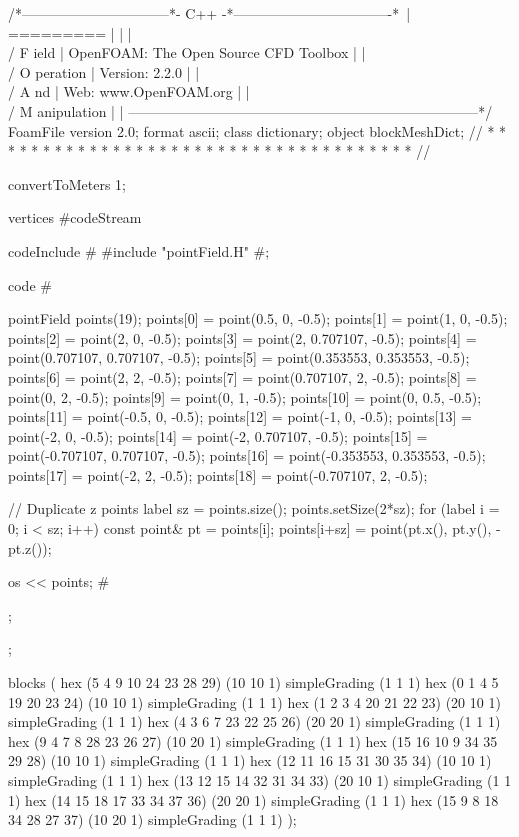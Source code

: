 \begin{OFverbatim}
/*--------------------------------*- C++ -*----------------------------------*\
| =========                 |                                                 |
| \\      /  F ield         | OpenFOAM: The Open Source CFD Toolbox           |
|  \\    /   O peration     | Version:  2.2.0                                 |
|   \\  /    A nd           | Web:      www.OpenFOAM.org                      |
|    \\/     M anipulation  |                                                 |
\*---------------------------------------------------------------------------*/
FoamFile
{
    version     2.0;
    format      ascii;
    class       dictionary;
    object      blockMeshDict;
}
// * * * * * * * * * * * * * * * * * * * * * * * * * * * * * * * * * * * * * //

convertToMeters 1;

vertices #codeStream
{
    codeInclude
    #{
        #include "pointField.H"
    #};

    code
    #{
        pointField points(19);
        points[0]  = point(0.5, 0, -0.5);
        points[1]  = point(1, 0, -0.5);
        points[2]  = point(2, 0, -0.5);
        points[3]  = point(2, 0.707107, -0.5);
        points[4]  = point(0.707107, 0.707107, -0.5);
        points[5]  = point(0.353553, 0.353553, -0.5);
        points[6]  = point(2, 2, -0.5);
        points[7]  = point(0.707107, 2, -0.5);
        points[8]  = point(0, 2, -0.5);
        points[9]  = point(0, 1, -0.5);
        points[10] = point(0, 0.5, -0.5);
        points[11] = point(-0.5, 0, -0.5);
        points[12] = point(-1, 0, -0.5);
        points[13] = point(-2, 0, -0.5);
        points[14] = point(-2, 0.707107, -0.5);
        points[15] = point(-0.707107, 0.707107, -0.5);
        points[16] = point(-0.353553, 0.353553, -0.5);
        points[17] = point(-2, 2, -0.5);
        points[18] = point(-0.707107, 2, -0.5);

        // Duplicate z points
        label sz = points.size();
        points.setSize(2*sz);
        for (label i = 0; i < sz; i++)
        {
            const point& pt = points[i];
            points[i+sz] = point(pt.x(), pt.y(), -pt.z());
        }

        os  << points;
    #};
};


blocks          
(
    hex (5 4 9 10 24 23 28 29) (10 10 1) simpleGrading (1 1 1)
    hex (0 1 4 5 19 20 23 24) (10 10 1) simpleGrading (1 1 1)
    hex (1 2 3 4 20 21 22 23) (20 10 1) simpleGrading (1 1 1)
    hex (4 3 6 7 23 22 25 26) (20 20 1) simpleGrading (1 1 1)
    hex (9 4 7 8 28 23 26 27) (10 20 1) simpleGrading (1 1 1)
    hex (15 16 10 9 34 35 29 28) (10 10 1) simpleGrading (1 1 1)
    hex (12 11 16 15 31 30 35 34) (10 10 1) simpleGrading (1 1 1)
    hex (13 12 15 14 32 31 34 33) (20 10 1) simpleGrading (1 1 1)
    hex (14 15 18 17 33 34 37 36) (20 20 1) simpleGrading (1 1 1)
    hex (15 9 8 18 34 28 27 37) (10 20 1) simpleGrading (1 1 1)
);


\end{OFverbatim}
